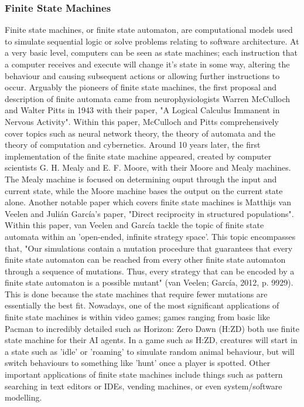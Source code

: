 \documentclass[12pt,a4paper]{article}
\begin{document}
\subsubsection{Finite State Machines}
Finite state machines, or finite state automaton, are computational models used to simulate sequential logic or solve problems relating to software architecture. At a very basic level, computers can be seen as state machines; each instruction that a computer receives and execute will change it's state in some way, altering the behaviour and causing subsequent actions or allowing further instructions to occur. Arguably the pioneers of finite state machines, the first proposal and description of finite automata came from neurophysiologists Warren McCulloch and Walter Pitts in 1943 with their paper, "A Logical Calculus Immanent in Nervous Activity". Within this paper, McCulloch and Pitts comprehensively cover topics such as neural network theory, the theory of automata and the theory of computation and cybernetics. Around 10 years later, the first implementation of the finite state machine appeared, created by computer scientists G. H. Mealy and E. F. Moore, with their Moore and Mealy machines. The Mealy machine is focused on determining ouput through the input and current state, while the Moore machine bases the output on the current state alone. Another notable paper which covers finite state machines is Matthijs van Veelen and Julián García's paper, "Direct reciprocity in structured populations". Within this paper, van Veelen and García tackle the topic of finite state automata within an 'open-ended, infinite strategy space'. This topic encompasses that, "Our simulations contain a mutation procedure that
guarantees that every finite state automaton can be reached from every other finite state automaton through a sequence of mutations. Thus, every strategy that can be encoded by a finite state automaton is a possible mutant" (van Veelen; García, 2012, p. 9929). This is done because the state machines that require fewer mutations are essentially the best fit. Nowadays, one of the most significant applications of finite state machines is within video games; games ranging from basic like Pacman to incredibly detailed such as Horizon: Zero Dawn (H:ZD) both use finite state machine for their AI agents. In a game such as H:ZD, creatures will start in a state such as 'idle' or 'roaming' to simulate random animal behaviour, but will switch behaviours to something like 'hunt' once a player is spotted. Other important applications of finite state machines include things such as pattern searching in text editors or IDEs, vending machines, or even system/software modelling. \\
\end{document}
